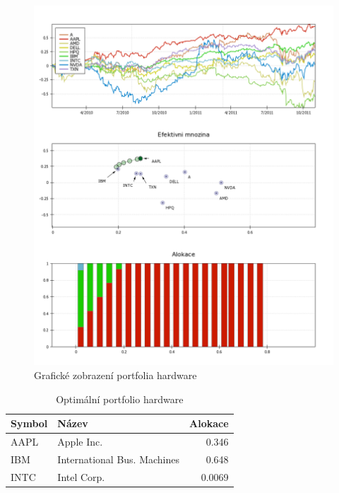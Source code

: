 \documentclass[12pt,a4paper]{report}
\begin{document}
    \begin{figure}[htb]
      \centering
      \includegraphics[height=0.90\textheight]{hw1.png}
      \caption{Grafické zobrazení portfolia hardware}
    \end{figure}

    \begin{table}[htb]
      \centering
      \begin{tabular}{|l|l|r|}
        \hline
        Symbol&Název&Alokace\\\hline\hline
        AAPL&Apple Inc. &0.346\\\hline
        IBM&International Bus. Machines &0.648\\\hline
        INTC&Intel Corp. &0.0069\\\hline
      \end{tabular}
      \caption{Optimální portfolio hardware}
    \end{table}
    
  \clearpage
\end{document}
